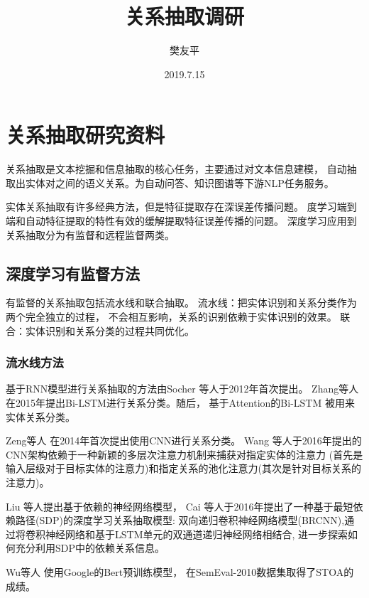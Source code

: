 \documentclass[UTF8,12pt]{ctexart}
\title{关系抽取调研}
\author{樊友平}
\date{2019.7.15}
\begin{document}
    \maketitle
    \pagestyle{plain}
    \tableofcontents
    \thispagestyle{empty}
    
    \newpage
    \setcounter{page}{1}
    \section{关系抽取研究资料}
    关系抽取是文本挖掘和信息抽取的核心任务，主要通过对文本信息建模，
    自动抽取出实体对之间的语义关系。为自动问答、知识图谱等下游NLP任务服务。
    
    实体关系抽取有许多经典方法，但是特征提取存在深误差传播问题。
    度学习端到端和自动特征提取的特性有效的缓解提取特征误差传播的问题。
    深度学习应用到关系抽取分为有监督和远程监督两类。

    \subsection{深度学习有监督方法}
    有监督的关系抽取包括流水线和联合抽取。
    流水线：把实体识别和关系分类作为两个完全独立的过程，
    不会相互影响，关系的识别依赖于实体识别的效果。
    联合：实体识别和关系分类的过程共同优化。
    \subsubsection{流水线方法}
    基于RNN模型进行关系抽取的方法由Socher \cite{socher2012semantic} 等人于2012年首次提出。
    Zhang等人 \cite{zhang2015bidirectional} 在2015年提出Bi-LSTM进行关系分类。随后，
    基于Attention的Bi-LSTM \cite{zhou2016attention}\cite{xiao2016semantic}
    \cite{lee2019semantic}被用来实体关系分类。
    
    Zeng等人 \cite{zeng2014relation} 在2014年首次提出使用CNN进行关系分类。
    Wang \cite{wang2016relation} 等人于2016年提出的CNN架构依赖于一种新颖的多层次注意力机制来捕获对指定实体的注意力
    (首先是输入层级对于目标实体的注意力)和指定关系的池化注意力(其次是针对目标关系的注意力)。

    Liu \cite{liu2015dependency} 等人提出基于依赖的神经网络模型，
    Cai \cite{cai2016bidirectional} 等人于2016年提出了一种基于最短依赖路径(SDP)的深度学习关系抽取模型:
    双向递归卷积神经网络模型(BRCNN),通过将卷积神经网络和基于LSTM单元的双通道递归神经网络相结合,
    进一步探索如何充分利用SDP中的依赖关系信息。
    
    Wu等人 \cite{wu2019enriching} 使用Google的Bert预训练模型，
    在SemEval-2010数据集取得了STOA的成绩。
\end{document}
